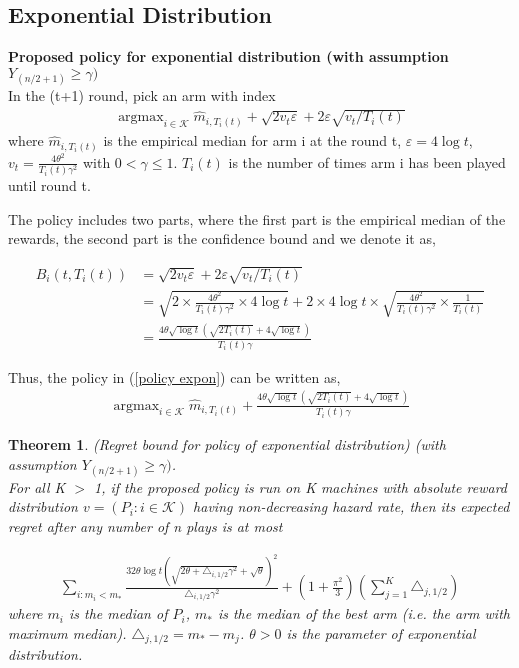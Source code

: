 \documentclass{article}
\DeclareMathOperator*{\argmax}{argmax}
\theoremstyle{plain}
\newtheorem{theo}{Theorem}
\begin{document}
\subsection{Exponential Distribution}

\textbf{Proposed policy for exponential distribution (with assumption $Y_{(n/2 + 1)} \geq \gamma)$}\\

In the (t+1) round, pick an arm with index 
\begin{align}
   \label{policy expon}
   \argmax_{i \in \mathcal{K}} \hat{m}_{i, T_i(t)} + \sqrt{2v_t \varepsilon} + 2 \varepsilon \sqrt{v_t/T_i(t)}
\end{align}
where $\hat{m}_{i, T_i(t)}$ is the empirical median for arm i at the round t, $\varepsilon = 4 \log t$, $v_t = \frac{4 \theta^2}{T_i(t) \gamma^2}$ with $0 < \gamma \leq 1$. $T_i(t)$ is the number of times arm i has been played until round t.  

The policy includes two parts, where the first part is the empirical median of the rewards, the second part is the confidence bound and we denote it as,

\begin{align}
B_i(t, T_i(t)) &= \sqrt{2v_t \varepsilon} + 2 \varepsilon \sqrt{v_t/T_i(t)}\\
&= \sqrt{2 \times \frac{4 \theta^2}{T_i(t) \gamma^2} \times 4 \log t} + 2 \times 4 \log t \times \sqrt{\frac{4 \theta^2}{T_i(t) \gamma^2} \times \frac{1}{T_i(t)}}\\
&= \frac{4 \theta \sqrt{\log t} ( \sqrt{ 2T_i(t)} + 4\sqrt{\log t})}{T_i(t) \gamma}
\end{align}

Thus, the policy in (\ref{policy expon}) can be written as,
\begin{align}
    \argmax_{i \in \mathcal{K}} \hat{m}_{i, T_i(t)} +  \frac{4 \theta \sqrt{\log t} ( \sqrt{ 2T_i(t)} + 4\sqrt{\log t})}{T_i(t) \gamma}
\end{align}

\begin{theo}
(Regret bound for policy of exponential distribution) (with assumption $Y_{(n/2 + 1)} \geq \gamma)$. \\

For all K $>$ 1, if the proposed policy is run on K machines with absolute reward distribution $v = (P_i: i \in \mathcal{K})$ having non-decreasing hazard rate, then its expected regret after any number of n plays is at most 

\begin{align}
    \sum_{i: m_i < m_\ast} \frac{32 \theta \log t (\sqrt{2 \theta + \triangle_{i, 1/2} \gamma^2} + \sqrt{\theta})^2}{ \triangle_{i, 1/2} \gamma^2} + (1 + \frac{\pi^2}{3}) (\sum_{j=1}^K \triangle_{j, 1/2}) 
\end{align}
where $m_i$ is the median of $P_i$, $m_\ast$ is the median of the best arm (i.e. the arm with maximum median). $\triangle_{j, 1/2} = m_\ast - m_j$. $\theta > 0$ is the parameter of exponential distribution. 
\end{theo}
\end{document}
